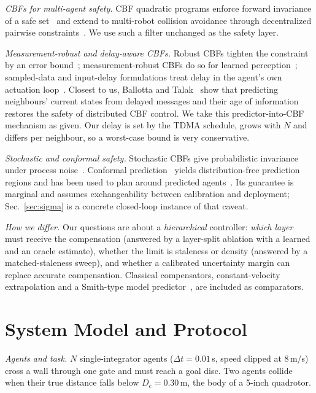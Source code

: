 \documentclass[letterpaper,10pt,journal,twoside]{IEEEtran}
\begin{document}
\emph{CBFs for multi-agent safety.} CBF quadratic programs enforce forward invariance of a safe
set~\cite{ames2017cbf,ames2019cbf} and extend to multi-robot collision avoidance through decentralized pairwise
constraints~\cite{borrmann2015control,wang2017safety}. We use such a filter unchanged as the safety layer.

\emph{Measurement-robust and delay-aware CBFs.} Robust CBFs tighten the constraint by an error
bound~\cite{jankovic2018robust}; measurement-robust CBFs do so for learned
perception~\cite{dean2020guaranteeing,cosner2021measurement}; sampled-data and input-delay formulations treat
delay in the agent's own actuation loop~\cite{singletary2020sampled,molnar2023delay}. Closest to us, Ballotta
and Talak~\cite{ballotta2025safe} show that predicting neighbours' current states from delayed messages and
their age of information restores the safety of distributed CBF control. We take this predictor-into-CBF
mechanism as given. Our delay is set by the TDMA schedule, grows with $N$ and differs per neighbour, so a
worst-case bound is very conservative.

\emph{Stochastic and conformal safety.} Stochastic CBFs give probabilistic invariance under process
noise~\cite{clark2021stochastic}. Conformal prediction~\cite{vovk2005algorithmic,shafer2008tutorial,angelopoulos2023conformal}
yields distribution-free prediction regions and has been used to plan around predicted
agents~\cite{lindemann2023safe,dixit2023adaptive}. Its guarantee is marginal and assumes exchangeability between
calibration and deployment; Sec.~\ref{sec:sigma} is a concrete closed-loop instance of that caveat.

\emph{How we differ.} Our questions are about a \emph{hierarchical} controller: \emph{which layer} must receive
the compensation (answered by a layer-split ablation with a learned and an oracle estimate), whether the limit
is staleness or density (answered by a matched-staleness sweep), and whether a calibrated uncertainty margin can
replace accurate compensation. Classical compensators, constant-velocity extrapolation and a Smith-type model
predictor~\cite{smith1957closer}, are included as comparators.

\section{System Model and Protocol}
\label{sec:model}
\emph{Agents and task.} $N$ single-integrator agents ($\Delta t{=}0.01$\,s, speed clipped at 8\,m/s) cross a
wall through one gate and must reach a goal disc. Two agents collide when their true distance falls below
$D_{\mathrm{c}}{=}0.30$\,m, the body of a 5-inch quadrotor.
\end{document}
